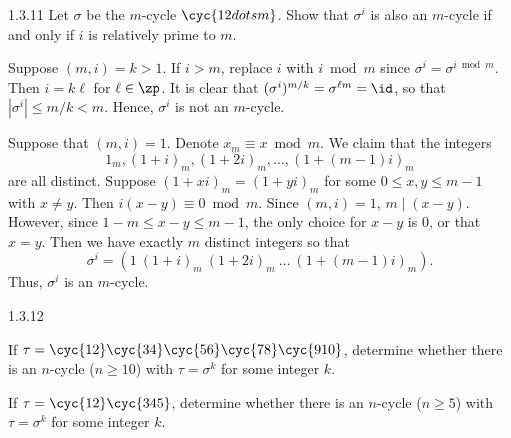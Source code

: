 \begin{spex}{1.3.11}
    Let $\sigma$ be the $m$-cycle $\cyc{1 2 dots m}$.
	Show that $\sigma^i$ is also an $m$-cycle if and only if $i$ is relatively prime to $m$.
\end{spex}

\begin{soliff}[spsol]
    \rightimp Suppose $(m, i) = k > 1$.
	If $i > m$, replace $i$ with $i \bmod m$ since $\sigma^i = \sigma^{i \bmod m}$.
	Then $i = k\ell$ for $\ell \in \zp$.
	It is clear that $(\sigma^i)^{m/k} = \sigma^{\ell m} = \id$, so that $|\sigma^i| \leq m/k < m$.
	Hence, $\sigma^i$ is not an $m$-cycle.
    
    \leftimp Suppose that $(m, i) = 1$.
	Denote $x_m \equiv x \bmod m$.
	We claim that the integers
    \[
    	1_m, (1 + i)_m, (1 + 2i)_m, \ldots, (1 + (m - 1)i)_m
    \]
    are all distinct.
	Suppose $(1 + xi)_m = (1 + yi)_m$ for some $0 \leq x, y \leq m - 1$ with $x \neq y$.
	Then $i(x - y) \equiv 0 \bmod m$.
	Since $(m, i) = 1$, $m \mid (x - y)$.
	However, since $1 - m \leq x - y \leq m - 1$, the only choice for $x - y$ is 0, or that $x = y$.
	Then we have exactly $m$ distinct integers so that
    \[
    	\sigma^i = (1\ (1 + i)_m\ (1 + 2i)_m\ \ldots\ (1 + (m - 1)i)_m).
    \]
    Thus, $\sigma^i$ is an $m$-cycle.
\end{soliff}

\begin{exercise}{1.3.12}
    \begin{subexercises}
        \item If $\tau = \cyc{1 2}\cyc{3 4}\cyc{5 6}\cyc{7 8}\cyc{9 10}$, determine whether there is an $n$-cycle ($n \ge 10$) with $\tau = \sigma^k$ for some integer $k$.
        \item If $\tau = \cyc{1 2}\cyc{3 4 5}$, determine whether there is an $n$-cycle ($n \ge 5$) with $\tau = \sigma^k$ for some integer $k$.
    \end{subexercises}
\end{exercise}

